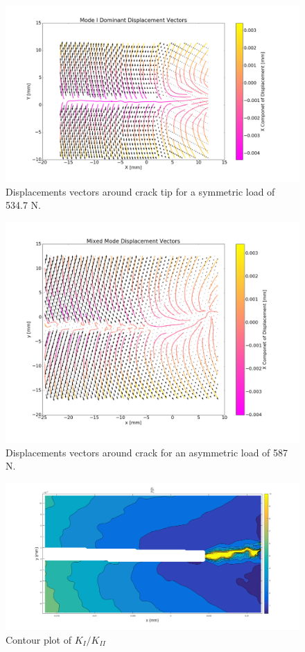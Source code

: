 \documentclass[12pt]{article}
\begin{document}
\begin{figure}[H]
	\centering
	\includegraphics[width=1\textwidth,scale=1]{QuiverModeI.png}
	\caption{Displacements vectors around crack tip for a symmetric load of 534.7 N.}
	\label{fig:Quiver1}
\end{figure}

\begin{figure}[H]
	\centering
	\includegraphics[width=1\textwidth, scale=1]{quiverMixedMode.png}
	\caption{Displacements vectors around crack for an asymmetric load of 587 N.}
	\label{fig:QuiverMix}
\end{figure}

\begin{figure}[H]
	\centering
	\includegraphics[width=1\textwidth]{Mixed_Mode_ratio.png}
	\caption{Contour plot of $K_{I}/K_{II}$}
	\label{fig:mm_comp}
\end{figure}
\end{document}
